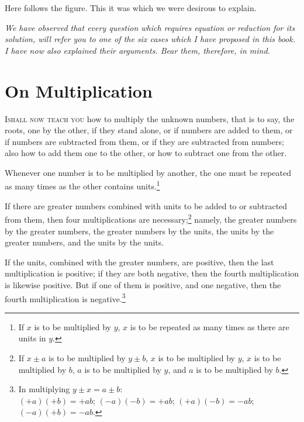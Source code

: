 Here follows the figure. This it was which we were desirous to explain.

\vspace{0.3cm}
\begin{center}
\textit{We have observed that every question which requires equation or reduction for its solution, will refer you to one of the six cases which I have proposed in this book. I have now also explained their arguments. Bear them, therefore, in mind.}
\end{center}

\clearpage


\section*{On Multiplication}

\lettrine{I}{shall now teach you} how to multiply the unknown numbers, that is to say, the roots, one by the other, if they stand alone, or if numbers are added to them, or if numbers are subtracted from them, or if they are subtracted from numbers; also how to add them one to the other, or how to subtract one from the other.

Whenever one number is to be multiplied by another, the one must be repeated as many times as the other contains units.\footnote{If $x$ is to be multiplied by $y$, $x$ is to be repeated as many times as there are units in $y$.}

If there are greater numbers combined with units to be added to or subtracted from them, then four multiplications are necessary;\footnote{If $x \pm a$ is to be multiplied by $y \pm b$, $x$ is to be multiplied by $y$, $x$ is to be multiplied by $b$, $a$ is to be multiplied by $y$, and $a$ is to be multiplied by $b$.} namely, the greater numbers by the greater numbers, the greater numbers by the units, the units by the greater numbers, and the units by the units.

If the units, combined with the greater numbers, are positive, then the last multiplication is positive; if they are both negative, then the fourth multiplication is likewise positive. But if one of them is positive, and one negative, then the fourth multiplication is negative.\footnote{In multiplying $y \pm x = a \pm b$:\\$(+a)(+b) = +ab$; $(-a)(-b) = +ab$; $(+a)(-b) = -ab$; $(-a)(+b) = -ab$.}

